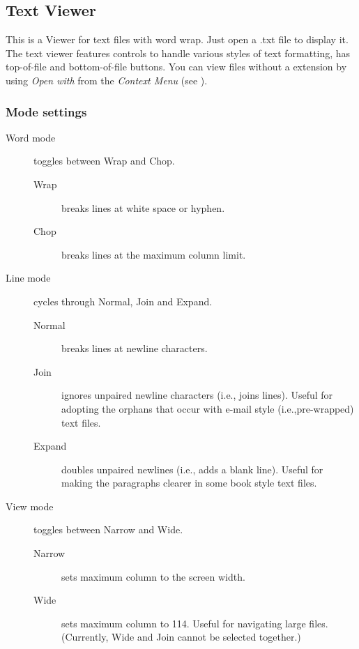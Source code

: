 \subsection{Text Viewer}
This is a Viewer for text files with word wrap. Just open a .txt file to
display it. The text viewer features controls to handle various styles of text
formatting, has top{}-of{}-file and bottom{}-of{}-file buttons. You can view
files without a  extension by using \emph{Open with} from the
\emph{Context Menu} (see ).

\subsubsection{Mode settings}

\begin{description}
\item[Word mode] toggles between Wrap and Chop.
    \begin{description}
        \item[Wrap] breaks lines at white space or hyphen.
        \item[Chop] breaks lines at the maximum column limit.
    \end{description}  
\item[Line mode] cycles through Normal, Join and Expand.
    \begin{description}
        \item[Normal] breaks lines at newline characters.
        \item[Join] ignores unpaired newline characters (i.e., joins lines).
        Useful for adopting the orphans that occur with e{}-mail style
        (i.e.,pre{}-wrapped) text files.
        \item[Expand] doubles unpaired newlines (i.e., adds a blank line).
        Useful for making the paragraphs clearer in some book style text files.
    \end{description}
\item[View mode] toggles between Narrow and Wide.
    \begin{description}
        \item[Narrow] sets maximum column to the screen width.
        \item[Wide] sets maximum column to 114. Useful for navigating large files. (Currently, Wide and Join cannot be selected together.)
    \end{description}
\end{description}
